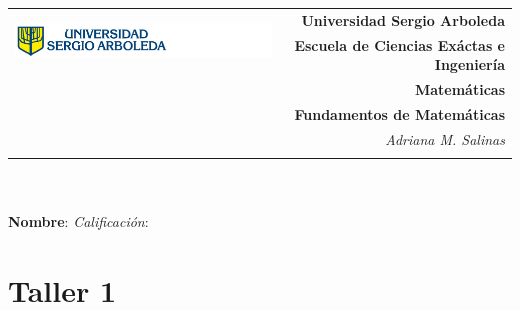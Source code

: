 \documentclass[12pt,letterpaper]{exam}
\newcommand{\base}[1]{\underline{\hspace{#1}}}
\newcommand{\uni}{Universidad Sergio Arboleda}
\newcommand{\fac}{\normalsize{Escuela de Ciencias Exáctas e Ingeniería}}
\newcommand{\dep}{Matemáticas}
\newcommand{\mat}{Fundamentos de  Matem\'aticas} %
\newcommand{\tema}{} %
\newcommand{\autor}{Adriana M. Salinas}
\begin{document}
\begin{tabular}{lr}
    \multirow{2}{*}{\includegraphics[height=1.4cm]{logosergio.png}} &
    {\textbf{\uni}} \\
    & {\textbf{\fac}} \\
    & {\textbf{\dep}} \\
    & {\textbf{\mat \tema}} \\
    & {\textit{\autor}} \\
    & {\textit{}}
\end{tabular}\\
\base{19.5cm}\\
\textbf{Nombre}: \base{13.2cm} \quad \textit{Calificación}: \base{2cm} \\[6pt]

\section*{Taller 1}
\end{document}
